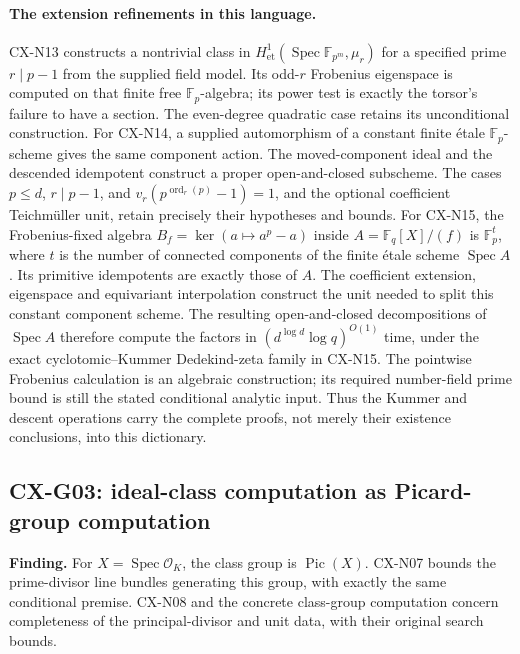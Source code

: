 \paragraph{The extension refinements in this language.}
CX-N13 constructs a nontrivial class in
$H^1_{\mathrm{et}}(\operatorname{Spec}\mathbb F_{p^m},\mu_r)$
for a specified prime $r\mid p-1$ from the supplied field model.
Its odd-$r$ Frobenius eigenspace is computed on that finite free
$\mathbb F_p$-algebra; its power test is exactly the torsor's
failure to have a section. The even-degree quadratic case retains
its unconditional construction.
For CX-N14, a supplied automorphism of a constant finite étale
$\mathbb F_p$-scheme gives the same component action. The moved-component
ideal and the descended idempotent construct a proper open-and-closed
subscheme. The cases $p\le d$, $r\mid p-1$, and
$v_r(p^{\operatorname{ord}_r(p)}-1)=1$, and the optional coefficient
Teichmüller unit, retain precisely their hypotheses and bounds.
For CX-N15, the Frobenius-fixed algebra
$B_f=\ker(a\mapsto a^p-a)$ inside
$A=\mathbb F_q[X]/(f)$ is $\mathbb F_p^t$, where $t$ is the number
of connected components of the finite étale scheme $\operatorname{Spec}A$.
Its primitive idempotents are exactly those of $A$.
The coefficient extension, eigenspace and equivariant interpolation
construct the unit needed to split this constant component scheme.
The resulting open-and-closed decompositions of $\operatorname{Spec}A$
therefore compute the factors in
$(d^{\log d}\log q)^{O(1)}$ time, under the exact cyclotomic--Kummer
Dedekind-zeta family in CX-N15. The pointwise Frobenius calculation is
an algebraic construction; its required number-field prime bound is
still the stated conditional analytic input.
Thus the Kummer and descent operations carry the complete proofs,
not merely their existence conclusions, into this dictionary.

\subsection{CX-G03: ideal-class computation as Picard-group computation}
\label{finding:CX-G03}

\textbf{Finding.} For $X=\operatorname{Spec}\mathcal O_K$,
the class group is $\operatorname{Pic}(X)$.  CX-N07 bounds the prime-divisor
line bundles generating this group, with exactly the same conditional
premise.  CX-N08 and the concrete class-group computation concern completeness
of the principal-divisor and unit data, with their original search bounds.

